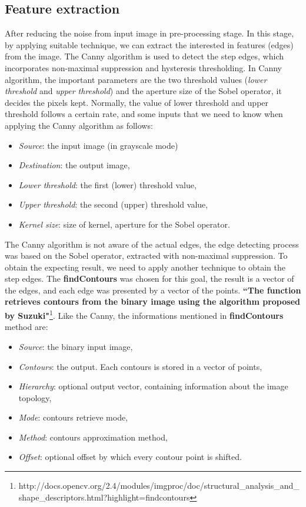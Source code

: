 \subsection{Feature extraction}
After reducing the noise from input image in pre-processing stage. In this stage, by applying suitable technique, we can extract the interested in features (edges) from the image. The Canny\cite{canny1986computational} algorithm is used to detect the step edges, which incorporates non-maximal suppression and hysteresis thresholding. In Canny algorithm, the important parameters are the two threshold values (\textit{lower threshold} and \textit{upper threshold}) and the aperture size of the Sobel operator, it decides the pixels kept. Normally, the value of lower threshold and upper threshold follows a certain rate, and some inputs that we need to know when applying the Canny algorithm as follows:
\begin{itemize}
\item \textit{Source}: the input image (in grayscale mode)
\item \textit{Destination}: the output image,
\item \textit{Lower threshold}: the first (lower) threshold value,
\item \textit{Upper threshold}: the second (upper) threshold value,
\item \textit{Kernel size}: size of kernel, aperture for the Sobel operator.
\end{itemize}
The Canny algorithm is not aware of the actual edges, the edge detecting process was based on the Sobel operator, extracted with non-maximal suppression. To obtain the expecting result, we need to apply another technique to obtain the step edges. The \textbf{findContours} was chosen for this goal, the result is a vector of the edges, and each edge was presented by a vector of the points. \textbf{``The function retrieves contours from the binary image using the algorithm proposed by Suzuki\cite{suzuki1985topological}"}\footnote{http://docs.opencv.org/2.4/modules/imgproc/doc/structural\_analysis\_and\_shape\_descriptors.html?highlight=findcontours}. Like the Canny, the informations mentioned in \textbf{findContours} method are:
\begin{itemize}
\item \textit{Source}: the binary input image,
\item \textit{Contours}: the output. Each contours is stored in a vector of points,
\item \textit{Hierarchy}: optional output vector, containing information about the image topology,
\item \textit{Mode}: contours retrieve mode,
\item \textit{Method}: contours approximation method,
\item \textit{Offset}: optional offset by which every contour point is shifted.
\end{itemize}
